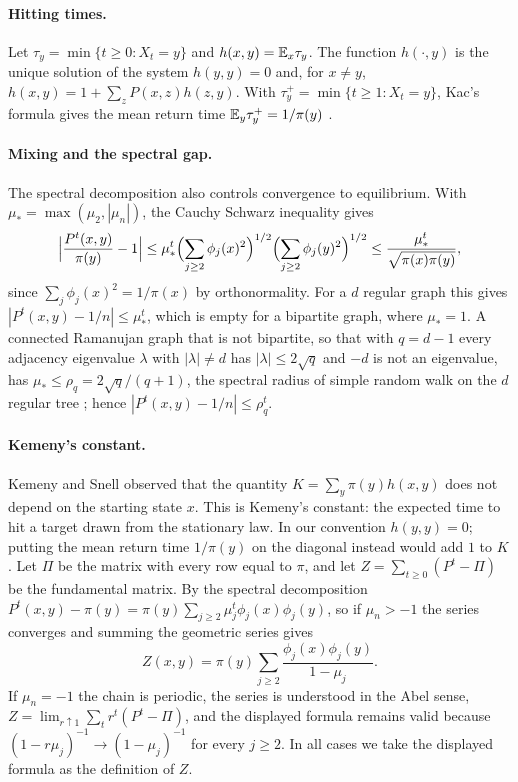 \paragraph{Hitting times.} Let $\tau_y=\min\{t\ge0:X_t=y\}$ and $h(x,y)=\mathbb{E}_x\tau_y$. The function $h(\cdot,y)$ is the unique solution of the system $h(y,y)=0$ and, for $x\ne y$, $h(x,y)=1+\sum_zP(x,z)h(z,y)$. With $\tau_y^+=\min\{t\ge1:X_t=y\}$, Kac's formula gives the mean return time $\mathbb{E}_y\tau_y^+=1/\pi(y)$ \cite{aldousfill}.

\paragraph{Mixing and the spectral gap.} The spectral decomposition also controls convergence to equilibrium. With $\mu_*=\max(\mu_2,|\mu_n|)$, the Cauchy Schwarz inequality gives
\[
\Bigl|\frac{P^t(x,y)}{\pi(y)}-1\Bigr|\le\mu_*^t\Bigl(\sum_{j\ge2}\phi_j(x)^2\Bigr)^{1/2}\Bigl(\sum_{j\ge2}\phi_j(y)^2\Bigr)^{1/2}\le\frac{\mu_*^t}{\sqrt{\pi(x)\pi(y)}},
\]
since $\sum_j\phi_j(x)^2=1/\pi(x)$ by orthonormality. For a $d$ regular graph this gives $|P^t(x,y)-1/n|\le\mu_*^t$, which is empty for a bipartite graph, where $\mu_*=1$. A connected Ramanujan graph that is not bipartite, so that with $q=d-1$ every adjacency eigenvalue $\lambda$ with $|\lambda|\ne d$ has $|\lambda|\le2\sqrt q$ and $-d$ is not an eigenvalue, has $\mu_*\le\rho_q=2\sqrt q/(q+1)$, the spectral radius of simple random walk on the $d$ regular tree \cite{kesten1959}; hence $|P^t(x,y)-1/n|\le\rho_q^t$.

\paragraph{Kemeny's constant.} Kemeny and Snell \cite{kemenysnell1960} observed that the quantity $K=\sum_y\pi(y)h(x,y)$ does not depend on the starting state $x$. This is Kemeny's constant: the expected time to hit a target drawn from the stationary law. In our convention $h(y,y)=0$; putting the mean return time $1/\pi(y)$ on the diagonal instead would add $1$ to $K$. Let $\Pi$ be the matrix with every row equal to $\pi$, and let $Z=\sum_{t\ge0}(P^t-\Pi)$ be the fundamental matrix. By the spectral decomposition $P^t(x,y)-\pi(y)=\pi(y)\sum_{j\ge2}\mu_j^t\phi_j(x)\phi_j(y)$, so if $\mu_n>-1$ the series converges and summing the geometric series gives
\[
Z(x,y)=\pi(y)\sum_{j\ge2}\frac{\phi_j(x)\phi_j(y)}{1-\mu_j}.
\]
If $\mu_n=-1$ the chain is periodic, the series is understood in the Abel sense, $Z=\lim_{r\uparrow1}\sum_tr^t(P^t-\Pi)$, and the displayed formula remains valid because $(1-r\mu_j)^{-1}\to(1-\mu_j)^{-1}$ for every $j\ge2$. In all cases we take the displayed formula as the definition of $Z$.

